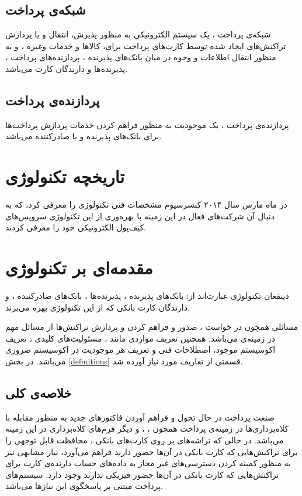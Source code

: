 \documentclass[oneside]{report}
\begin{document}
\subsection{شبکه‌ی پرداخت}
شبکه‌ی پرداخت 
			  			 				، 
			  			 				یک سیستم الکترونیکی به منظور پذیرش، انتقال و یا پردازش تراکنش‌های ایجاد شده توسط کارت‌های پرداخت برای، کالاها و خدمات وغیره ، و به منظور انتقال اطلاعات و وجوه در میان بانک‌های پذیرنده ، پردازنده‌های پرداخت ، پذیرنده‌ها و دارندگان کارت می‌باشد. 

\subsection{پردازنده‌ی پرداخت}			  			 							  			 				
پردازنده‌ی پرداخت 
			 	، 
یک موجودیت به منظور فراهم کردن خدمات پردازش پرداخت‌ها برای بانک‌های پذیرنده و یا صادر‌کننده می‌باشد. 
		
\section{تاریخچه تکنولوژی{\large  {}}}
					در ماه مارس سال ۲۰۱۴ کنسرسیوم 
					{\normalsize {}} 
					مشخصات فنی تکنولوژی 
					{\small {}} 
					را معرفی کرد، که به دنبال آن شرکت‌های فعال در این زمینه با بهره‌وری از این تکنولوژی سرویس‌های کیف‌پول الکترونیکی خود را معرفی کردند.

\section{مقدمه‌ای بر تکنولوژی{\large  {}} }					
ذینفعان تکنولوژی 
{\normalsize  {}}			
عبارت‌اند از:‌ بانک‌های پذیرنده ، پذیرنده‌ها ، بانک‌های صادرکننده ، و دارندگان کارت بانکی که از این تکنولوژی بهره می‌برند. 

مسائلی همچون در خواست
{\normalsize  {}}
، صدور و فراهم کردن
{\normalsize  {}}
و پردازش تراکنش‌ها از مسائل مهم در زمینه‌ی 
{\normalsize  {}}
می‌باشد. همچنین تعریف مواردی مانند ، مسئولیت‌های کلیدی ، تعریف اکوسیستم موجود، اصطلاحات فنی و تعریف هر موجودیت در اکوسیستم ضروری می‌باشد.  در بخش 
\ref{definitions}
قسمتی از تعاریف مورد نیاز آورده شد. 

\subsection{خلاصه‌ی کلی}
صنعت پرداخت در حال تحول و فراهم آوردن فاکتورهای جدید به منظور مقابله با کلاه‌برداری‌ها در زمینه‌ی پرداخت همچون ،
					{\normalsize {}} ، 
							{\normalsize {}}
	و دیگر فرم‌های کلاه‌برداری در این زمینه می‌باشد.  در حالی که تراشه‌های 
						{\normalsize {}}
بر روی کارت‌های بانکی ، محافظت قابل توجهی را برای تراکنش‌هایی که کارت بانکی در آن‌ها حضور دارند فراهم می‌آورد، نیاز مشابهی نیز به منظور کمینه کردن دسترسی‌های غیر مجاز به داده‌های حساب دارنده‌ی کارت برای تراکنش‌هایی که کارت بانکی در آن‌ها حضور فیزیکی ندارند وجود دارد.  سیستم‌های پرداخت مبتنی بر
					{\normalsize {}}
پاسخگوی این نیازها می‌باشد.
\end{document}

